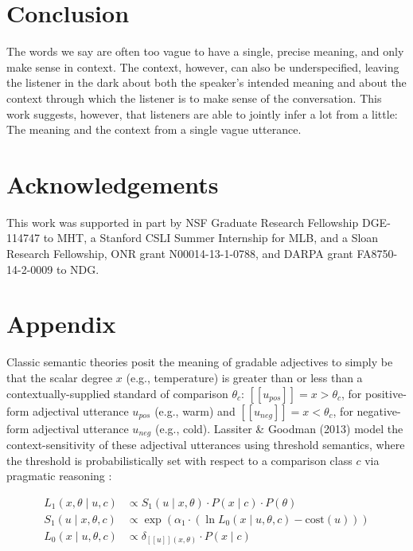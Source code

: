 \documentclass[doc]{apa6}
\begin{document}
\section{Conclusion}

The words we say are often too vague to have a single, precise meaning,
and only make sense in context. The context, however, can also be
underspecified, leaving the listener in the dark about both the
speaker's intended meaning and about the context through which the
listener is to make sense of the conversation. This work suggests,
however, that listeners are able to jointly infer a lot from a little:
The meaning and the context from a single vague utterance.


\section{Acknowledgements}

This work was supported in part by NSF Graduate Research Fellowship
DGE-114747 to MHT, a Stanford CSLI Summer Internship for MLB, and a
Sloan Research Fellowship, ONR grant N00014-13-1-0788, and DARPA grant
FA8750-14-2-0009 to NDG.

\newpage







\newpage
\section{Appendix}


Classic semantic theories posit the meaning of gradable adjectives to simply be that the scalar degree $x$ (e.g., temperature) is greater than or less than a contextually-supplied standard of comparison  \(\theta_c\): \([\![u_{pos}]\!] = x > \theta_c\), for positive-form adjectival utterance \(u_{pos}\) (e.g., warm) and \([\![u_{neg}]\!] = x < \theta_c\), for negative-form adjectival utterance \(u_{neg}\) (e.g., cold).
 Lassiter \& Goodman (2013) model the context-sensitivity of these adjectival utterances using threshold semantics, where
the threshold is probabilistically set with respect to a comparison class \(c\) via pragmatic reasoning :

\begin{align}
L_{1}(x, \theta \mid u, c) &\propto S_{1}(u \mid x, \theta) \cdot P(x \mid c) \cdot P(\theta) \label{eq:L1} \\
S_{1}(u \mid x, \theta, c) &\propto \exp{(\alpha_1 \cdot (\ln {L_{0}(x \mid u, \theta, c)} - \text{cost}(u)))} \label{eq:S1}\\
L_{0}(x \mid u, \theta, c) &\propto {\delta_{[\![u]\!](x, \theta)} \cdot P(x \mid c)} \label{eq:L0}
\end{align}
\end{document}
